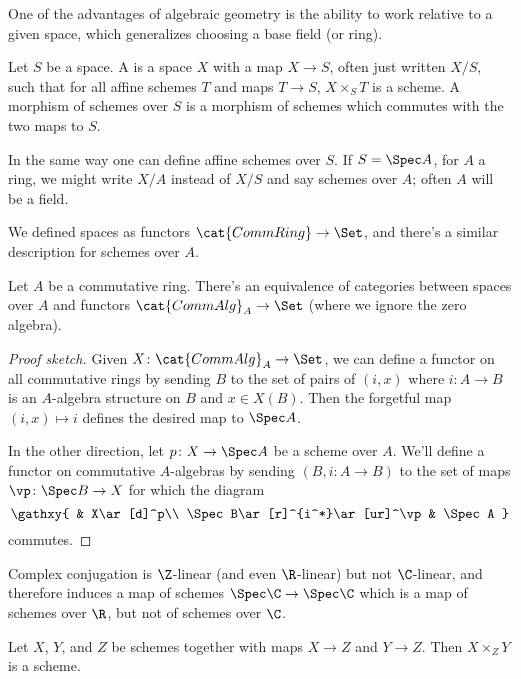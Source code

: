 One of the advantages of algebraic geometry is the ability to work relative to a given space, which generalizes
choosing a base field (or ring).
\begin{defn}
Let $S$ be a space. A  is a space $X$ with a map $X\to S$, often just written $X/S$, such
that for all affine schemes $T$ and maps $T\to S$, $X\times_S T$ is a scheme. A morphism of schemes over $S$ is a
morphism of schemes which commutes with the two maps to $S$.
\end{defn}
In the same way one can define affine schemes over $S$. If $S = \Spec A$, for $A$ a ring, we might write $X/A$
instead of $X/S$ and say schemes over $A$; often $A$ will be a field.

We defined spaces as functors $\cat{CommRing}\to\Set$, and there's a similar description for schemes over $A$.
\begin{prop}
Let $A$ be a commutative ring. There's an equivalence of categories between spaces over $A$ and functors
$\cat{CommAlg}_A\to\Set$ (where we ignore the zero algebra).
\end{prop}
\begin{proof}[Proof sketch]
Given $X\colon\cat{CommAlg}_A\to\Set$, we can define a functor on all commutative rings by sending $B$ to the set
of pairs of $(i,x)$ where $i\colon A\to B$ is an $A$-algebra structure on $B$ and $x\in X(B)$. Then the forgetful
map $(i,x)\mapsto i$ defines the desired map to $\Spec A$.

In the other direction, let $p\colon X\to\Spec A$ be a scheme over $A$. We'll define a functor on commutative
$A$-algebras by sending $(B, i\colon A\to B)$ to the set of maps $\vp\colon \Spec B\to X$ for which the diagram
\begin{equation}
\gathxy{
	& X\ar[d]^p\\
	\Spec B\ar[r]^{i^*}\ar[ur]^\vp & \Spec A
}
\end{equation}
commutes.
\end{proof}
\begin{exm}
Complex conjugation is $\Z$-linear (and even $\R$-linear) but not $\C$-linear, and therefore induces a map of
schemes $\Spec\C\to\Spec\C$ which is a map of schemes over $\R$, but not of schemes over $\C$.
\end{exm}
\begin{prop}
\label{pullbackscheme}
Let $X$, $Y$, and $Z$ be schemes together with maps $X\to Z$ and $Y\to Z$. Then $X\times_Z Y$ is a scheme.
\end{prop}

